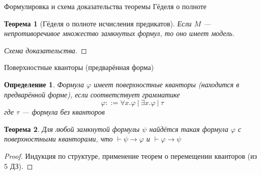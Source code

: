 \documentclass[aspectratio=169]{beamer}
\newtheorem{thm}{Теорема}[section]
\newtheorem{dfn}{Определение}[section]
\begin{document}
\begin{frame}{Формулировка и схема доказательства теоремы Гёделя о полноте}

\begin{thm}[Гёделя о полноте исчисления предикатов]
Если $M$ --- непротиворечивое множество замкнутых формул, то оно имеет модель.
\end{thm}
\begin{proof}[Схема доказательства]
\end{proof}
\end{frame}

\begin{frame}{Поверхностные кванторы (предварённая форма)}
\begin{dfn}
Формула $\varphi$ имеет поверхностные кванторы (находится в предварённой форме), если
соответствует грамматике
$$\varphi ::= \forall x.\varphi\ |\ \exists x.\varphi\ |\ \tau$$
где $\tau$ --- формула без кванторов
\end{dfn}\pause
\begin{thm}
Для любой замкнутой формулы $\psi$ найдётся такая формула $\varphi$ с поверхностными кванторами,
что $\vdash \psi\to\varphi$ и $\vdash\varphi\to\psi$
\end{thm}
\begin{proof}Индукция по структуре, применение теорем о перемещении кванторов (из 5 ДЗ).
\end{proof}
\end{frame}
\end{document}
